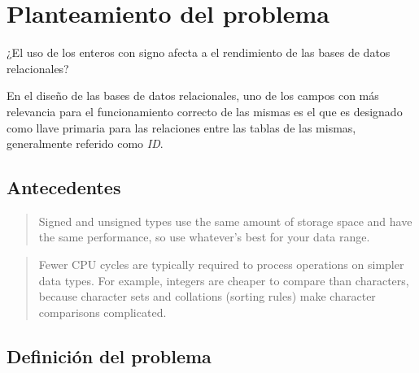\section{Planteamiento del problema}

¿El uso de los enteros con signo afecta a el rendimiento de las bases de datos relacionales?

En el diseño de las bases de datos relacionales, uno de los campos con más relevancia para el funcionamiento correcto de las mismas es el que es designado como llave primaria para las relaciones entre las tablas de las mismas, generalmente referido como \textit{ID}.




\subsection{Antecedentes}\label{sec:Ant}

\begin{quote}
   Signed and unsigned types use the same amount of storage space and have the same performance, so use whatever’s best for your data range.
   \cite{Schwartz_2012}
\end{quote}

\begin{quote}
   Fewer CPU cycles are typically required to process operations on simpler data types. For example, integers are cheaper to compare than characters, because character sets and collations (sorting rules) make character comparisons complicated.
   \cite{Schwartz_2012}
\end{quote}
\subsection{Definición del problema}
